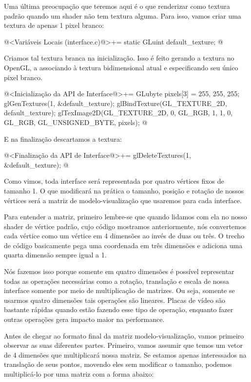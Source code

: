 Uma última preocupação que teremos aqui é o que renderizar como textura
padrão quando um shader não tem textura alguma. Para isso, vamos criar
uma textura de apenas 1 pixel branco:

\iniciocodigo
@<Variáveis Locais (interface.c)@>+=
static GLuint default_texture;
@
\fimcodigo

Criamos tal textura branca na inicialização. Isso é feito gerando a
textura no OpenGL, a associando à textura bidimensional atual e
especificando seu único pixel branco.

\iniciocodigo
@<Inicialização da API de Interface@>+=
{
  GLubyte pixels[3] = {255, 255, 255};
  glGenTextures(1, &default_texture);
  glBindTexture(GL_TEXTURE_2D, default_texture);
  glTexImage2D(GL_TEXTURE_2D, 0, GL_RGB, 1, 1, 0, GL_RGB, GL_UNSIGNED_BYTE,
               pixels);
}
@
\fimcodigo

E na finalização descartamos a textura:

\iniciocodigo
@<Finalização da API de Interface@>+=
glDeleteTextures(1, &default_texture);
@
\fimcodigo


Como vimos, toda interface será representada por quatro vértices fixos
de tamanho 1. O que modificará na prática o tamanho, posição e rotação
de nossos vértices será a matriz de modelo-visualização que usaremos
para cada interface.

Para entender a matriz, primeiro lembre-se que quando lidamos com ela
no nosso shader de vértice padrão, cujo código mostramos
anteriormente, nós convertemos cada vértice como um vértice em 4
dimensões ao invés de duas ou três. O trecho de código
 basicamente pega uma
coordenada em três dimensões e adiciona uma quarta dimensão sempre
igual a 1.

Nós fazemos isso porque somente em quatro dimensões é possível
representar todas as operações necessárias como a rotação, translação
e escala de nossa interface somente por meio de multiplicação de
matrizes. Ou seja, somente se usarmos quatro dimensões tais operações
são lineares. Placas de vídeo são bastante rápidas quando estão
fazendo esse tipo de operação, enquanto fazer outras operações gera
impacto maior na performance.

Antes de chegar ao formato final da matriz modelo-visualização, vamos
primeiro observar as suas diferentes partes. Primeiro, vamos assumir
que temos um vetor de 4 dimensões que multiplicará nossa matriz. Se
estamos apenas interessados na translação de seus pontos, movendo eles
sem modificar o tamanho, podemos multiplicá-lo por uma matriz com a
forma abaixo:

